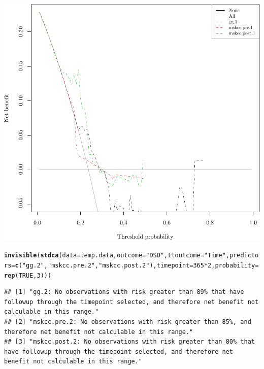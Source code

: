 \documentclass{article}\usepackage[]{graphicx}\usepackage[]{color}
\makeatletter
\def\maxwidth{ %
  \ifdim\Gin@nat@width>\linewidth
    \linewidth
  \else
    \Gin@nat@width
  \fi
}
\newcommand{\hlnum}[1]{\textcolor[rgb]{0.686,0.059,0.569}{#1}}%
\newcommand{\hlstr}[1]{\textcolor[rgb]{0.192,0.494,0.8}{#1}}%
\newcommand{\hlopt}[1]{\textcolor[rgb]{0,0,0}{#1}}%
\newcommand{\hlstd}[1]{\textcolor[rgb]{0.345,0.345,0.345}{#1}}%
\newcommand{\hlkwc}[1]{\textcolor[rgb]{0.333,0.667,0.333}{#1}}%
\newcommand{\hlkwd}[1]{\textcolor[rgb]{0.737,0.353,0.396}{\textbf{#1}}}%
\newenvironment{kframe}{%
 \def\at@end@of@kframe{}%
 \ifinner\ifhmode%
  \def\at@end@of@kframe{\end{minipage}}%
  \begin{minipage}{\columnwidth}%
 \fi\fi%
 \def\FrameCommand##1{\hskip\@totalleftmargin \hskip-\fboxsep
 \colorbox{shadecolor}{##1}\hskip-\fboxsep
     \hskip-\linewidth \hskip-\@totalleftmargin \hskip\columnwidth}%
 \MakeFramed {\advance\hsize-\width
   \@totalleftmargin\z@ \linewidth\hsize
   \@setminipage}}%
 {\par\unskip\endMakeFramed%
 \at@end@of@kframe}
\newenvironment{knitrout}{}{} %
\makeatother
\begin{document}
\begin{knitrout}
{\centering \includegraphics[width=\maxwidth]{figure/07-model-selection-dca-4} 

}


\begin{kframe}\begin{alltt}
\hlkwd{invisible}\hlstd{(}\hlkwd{stdca}\hlstd{(}\hlkwc{data} \hlstd{= temp.data,} \hlkwc{outcome} \hlstd{=} \hlstr{"DSD"}\hlstd{,} \hlkwc{ttoutcome} \hlstd{=} \hlstr{"Time"}\hlstd{,} \hlkwc{predictors} \hlstd{=} \hlkwd{c}\hlstd{(}\hlstr{"gg.2"}\hlstd{,} \hlstr{"mskcc.pre.2"}\hlstd{,} \hlstr{"mskcc.post.2"}\hlstd{),} \hlkwc{timepoint} \hlstd{=} \hlnum{365}\hlopt{*}\hlnum{2}\hlstd{,} \hlkwc{probability} \hlstd{=} \hlkwd{rep}\hlstd{(}\hlnum{TRUE}\hlstd{,} \hlnum{3}\hlstd{)))}
\end{alltt}
\begin{verbatim}
## [1] "gg.2: No observations with risk greater than 89% that have followup through the timepoint selected, and therefore net benefit not calculable in this range."        
## [2] "mskcc.pre.2: No observations with risk greater than 85%, and therefore net benefit not calculable in this range."                                                   
## [3] "mskcc.post.2: No observations with risk greater than 80% that have followup through the timepoint selected, and therefore net benefit not calculable in this range."
\end{verbatim}
\end{kframe}


\end{knitrout}
\end{document}
